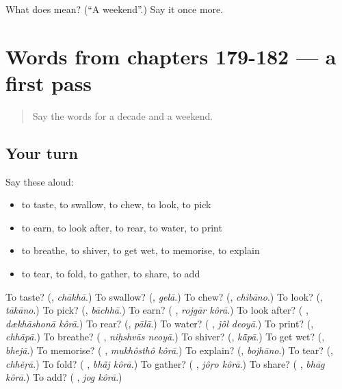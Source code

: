 \begin{tcolorbox}[breakable,colback=teal!4,colframe=teal!35!black,title={Before you move on}]
What does  mean? (\textquotedblleft{}A weekend\textquotedblright{}.) Say it once more.
\end{tcolorbox}
\section[(dialogue)]{Words from chapters 179-182 — a first pass}

\label{lesson:BN-R187-first-pass-words-from-chapters-179-182}



\begin{quote}
Say the words for a decade and a weekend.
\end{quote}

\subsection*{Your turn}
Say these aloud:

\begin{itemize}
\raggedright
  \item to taste, to swallow, to chew, to look, to pick
  \item to earn, to look after, to rear, to water, to print
  \item to breathe, to shiver, to get wet, to memorise, to explain
  \item to tear, to fold, to gather, to share, to add
\end{itemize}

\begin{tcolorbox}[breakable,colback=teal!4,colframe=teal!35!black,title={Before you move on}]
To taste? (\textbf{}, \emph{chākhā}.) To swallow? (\textbf{}, \emph{gelā}.) To chew? (\textbf{}, \emph{chibāno}.) To look? (\textbf{}, \emph{tākāno}.) To pick? (\textbf{}, \emph{bāchhā}.) To earn? (\textbf{ }, \emph{rojgār kôrā}.) To look after? (\textbf{ }, \emph{dækhāshonā kôrā}.) To rear? (\textbf{}, \emph{pālā}.) To water? (\textbf{ }, \emph{jôl deoyā}.) To print? (\textbf{}, \emph{chhāpā}.) To breathe? (\textbf{ }, \emph{niḥshvās neoyā}.) To shiver? (\textbf{}, \emph{kā̃pā}.) To get wet? (\textbf{}, \emph{bhejā}.) To memorise? (\textbf{ }, \emph{mukhôsthô kôrā}.) To explain? (\textbf{}, \emph{bojhāno}.) To tear? (\textbf{}, \emph{chhẽṛā}.) To fold? (\textbf{ }, \emph{bhā̃j kôrā}.) To gather? (\textbf{ }, \emph{jôṛo kôrā}.) To share? (\textbf{ }, \emph{bhāg kôrā}.) To add? (\textbf{ }, \emph{jog kôrā}.)
\end{tcolorbox}
